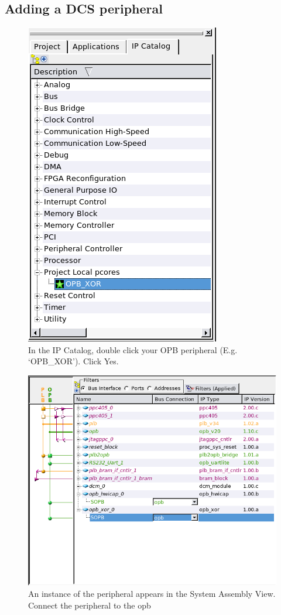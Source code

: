 \documentclass[a4paper,oneside]{memoir}
\begin{document}
\subsection{Adding a DCS peripheral}
\begin{figure}[H]
\centering
\includegraphics[scale=0.5]{AXOR1}
\caption{In the IP Catalog, double click your OPB peripheral (E.g. `OPB\_XOR'). Click Yes.\label{fig:AXOR1}}
\end{figure}
\begin{figure}[H]
\centering
\includegraphics[scale=0.5]{AXOR2}
\caption{An instance of the peripheral appears in the System Assembly View. Connect the peripheral to the opb\label{fig:AXOR2}}
\end{figure}
\end{document}
